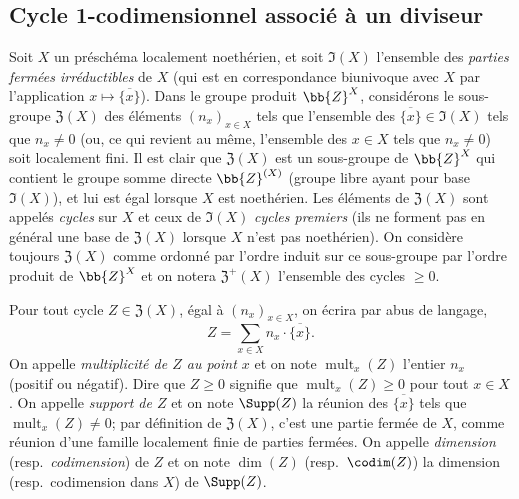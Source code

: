 \subsection{Cycle 1-codimensionnel associé à un diviseur}
\label{IV.21.6}

\begin{env}[21.6.1]
Soit $X$ un préschéma localement noethérien, et soit $\mathfrak{I}(X)$ l'ensemble des \emph{parties fermées irréductibles} de $X$ (qui est en correspondance biunivoque avec $X$ par l'application $x\mapsto\overline{\{x\}}$).
Dans le groupe produit $\bb{Z}^X$, considérons le sous-groupe $\mathfrak{Z}(X)$ des éléments $(n_x)_{x\in X}$ tels que l'ensemble des $\overline{\{x\}}\in\mathfrak{I}(X)$ tels que $n_x\neq0$ (ou, ce qui revient au même, l'ensemble des $x\in X$ tels que $n_x\neq0$) soit localement fini.
Il est clair que $\mathfrak{Z}(X)$ est un sous-groupe de $\bb{Z}^X$ qui contient le groupe somme directe $\bb{Z}^{(X)}$ (groupe libre ayant pour base $\mathfrak{I}(X)$), et lui est égal lorsque $X$ est noethérien.
Les éléments de $\mathfrak{Z}(X)$ sont appelés \emph{cycles} sur $X$ et ceux de $\mathfrak{I}(X)$ \emph{cycles premiers} (ils ne forment pas en général une base de $\mathfrak{Z}(X)$ lorsque $X$ n'est pas noethérien).
On considère toujours $\mathfrak{Z}(X)$ comme ordonné par l'ordre induit sur ce sous-groupe par l'ordre produit de $\bb{Z}^X$ et on notera $\mathfrak{Z}^+(X)$ l'ensemble des cycles $\geq0$.


Pour tout cycle $Z\in\mathfrak{Z}(X)$, égal à $(n_x)_{x\in X}$, on écrira par abus de langage,
\[
  Z=\sum_{x\in X}n_x\cdot\overline{\{x\}}.
\]
On appelle \emph{multiplicité de $Z$ au point $x$} et on note $\operatorname{mult}_x(Z)$ l'entier $n_x$ (positif ou négatif).
Dire que $Z\geq0$ signifie que $\operatorname{mult}_x(Z)\geq0$ pour tout $x\in X$.
On appelle \emph{support de $Z$} et on note $\Supp(Z)$ la réunion des $\overline{\{x\}}$ tels que $\operatorname{mult}_x(Z)\neq0$;
par définition de $\mathfrak{Z}(X)$, c'est une partie fermée de $X$, comme réunion d'une famille localement finie de parties fermées.
On appelle \emph{dimension} (resp.\ \emph{codimension}) de $Z$ et on note $\dim(Z)$ (resp.\ $\codim(Z)$) la dimension (resp.\ codimension dans $X$) de $\Supp(Z)$.
\end{env}

